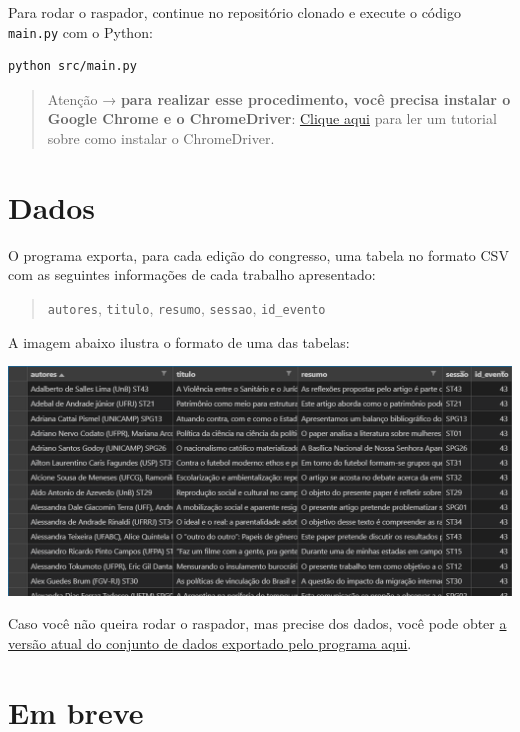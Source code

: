 \documentclass[
]{book}
\begin{document}
Para rodar o raspador, continue no repositório clonado e execute o código \texttt{main.py} com o Python:

\begin{verbatim}
python src/main.py
\end{verbatim}

\begin{quote}
Atenção → \textbf{para realizar esse procedimento, você precisa instalar o Google Chrome e o ChromeDriver}: \href{https://chromedriver.chromium.org/getting-started}{Clique aqui} para ler um tutorial sobre como instalar o ChromeDriver.
\end{quote}

\hypertarget{dados-2}{%
\section{Dados}\label{dados-2}}

O programa exporta, para cada edição do congresso, uma tabela no formato CSV com as seguintes informações de cada trabalho apresentado:

\begin{quote}
\texttt{autores}, \texttt{titulo}, \texttt{resumo}, \texttt{sessao}, \texttt{id\_evento}
\end{quote}

A imagem abaixo ilustra o formato de uma das tabelas:

\includegraphics{img/anpocs_scraper_csv.png}

Caso você não queira rodar o raspador, mas precise dos dados, você pode obter \href{https://drive.google.com/drive/folders/1XdHLf3b7r0d1EwwlYo4D0bRBujVILBq7?usp=sharing}{a versão atual do conjunto de dados exportado pelo programa aqui}.

\hypertarget{em-breve}{%
\section{Em breve}\label{em-breve}}
\end{document}
